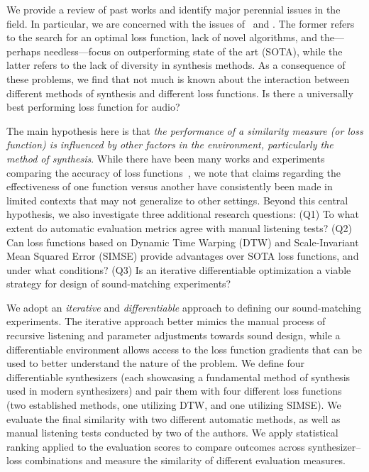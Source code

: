 We provide a review of past works and identify major perennial issues in the field. In particular, we are concerned with the issues of \LossSelect~and \SynthSelect. The former refers to the search for an optimal loss function, lack of novel algorithms, and the---perhaps needless---focus on outperforming state of the art (\gls{SOTA}), while the latter refers to the lack of diversity in synthesis methods. As a consequence of these problems, we find that not much is known about the interaction between different methods of synthesis and different loss functions. Is there a universally best performing loss function for audio? 

The main hypothesis here is that \textit{the performance of a similarity measure (or loss function) is influenced by other factors in the environment, particularly the method of synthesis}. While there have been many works and experiments comparing the accuracy of loss functions~\cite{vahidi2023mesostructures,turian2020sorry,engel2020ddsp,uzrad2024diffmoog,han2023perceptual,masuda2021soundmatch,turian2020sorry,bruford2024synthesizer}, we note that claims regarding the effectiveness of one function versus another have consistently been made in limited contexts that may not generalize to other settings. Beyond this central hypothesis, we also investigate three additional research questions: (Q1) To what extent do automatic evaluation metrics agree with manual listening tests? (Q2) Can loss functions based on Dynamic Time Warping (DTW) and Scale-Invariant Mean Squared Error (SIMSE) provide advantages over SOTA loss functions, and under what conditions?
(Q3) Is an iterative differentiable optimization a viable strategy for design of sound-matching experiments?

 We adopt an \textit{iterative} and \textit{differentiable} approach to defining our sound-matching experiments. The iterative approach better mimics the manual process of recursive listening and parameter adjustments towards sound design, while a differentiable environment allows access to the loss function gradients that can be used to better understand the nature of the problem. We define four differentiable synthesizers (each showcasing a fundamental method of synthesis used in modern synthesizers) and pair them with four different loss functions (two established methods, one utilizing DTW, and one utilizing SIMSE). We evaluate the final similarity with two different automatic methods, as well as manual listening tests conducted by two of the authors. We apply statistical ranking applied to the evaluation scores to compare outcomes across synthesizer–loss combinations and measure the similarity of different evaluation measures. 

